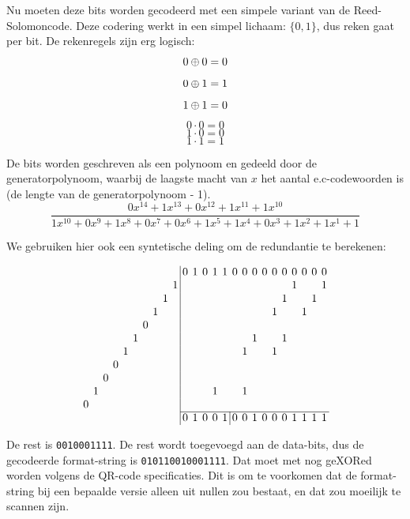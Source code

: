 \documentclass[a4paper]{article}
\begin{document}
Nu moeten deze bits worden gecodeerd met een simpele variant van de Reed-Solomoncode. Deze codering werkt in een simpel lichaam: $\{0,1\}$, dus reken gaat per bit. De rekenregels zijn erg logisch:
$$0 \mathbin{\oplus} 0=0$$
$$0 \mathbin{\oplus} 1=1$$
$$1 \mathbin{\oplus} 1=0$$
$$0\cdot0=0$$
$$1\cdot0=0$$
$$1\cdot1=1$$

De bits worden geschreven als een polynoom en gedeeld door de generatorpolynoom, waarbij de laagste macht van $x$ het aantal e.c-codewoorden is (de lengte van de generatorpolynoom - 1).
$$\frac{0x^{14}+1x^{13}+0x^{12}+1x^{11}+1x^{10}}
{1x^{10}+0x^9+1x^8+0x^7+0x^6+1x^5+1x^4+0x^3+1x^2+1x^1+1}
$$

We gebruiken hier ook een syntetische deling om de redundantie te berekenen:

\[
\setlength{\tabcolsep}{2pt}
\begin{tabular}{rrrrrrrrrr|rrrrrrrrrrrrrrr}
&&&&&&&&&&0&1&0&1&1&0&0&0&0&0&0&0&0&0&0\\
&&&&&&&&&1&&&&&&&&&&&&1&&&1\\
&&&&&&&&1&&&&&&&&&&&&1&&&1&\\
&&&&&&&1&&&&&&&&&&&&1&&&1&&\\
&&&&&&0&&&&&&&&&&&&&&&&&&\\
&&&&&1&&&&&&&&&&&&1&&&1&&&&\\
&&&&1&&&&&&&&&&&&1&&&1&&&&&\\
&&&0&&&&&&&&&&&&&&&&&&&&&\\
&&0&&&&&&&&&&&&&&&&&&&&&&\\
&1&&&&&&&&&&&&1&&&1&&&&&&&&\\
0&&&&&&&&&&&&&&&&&&&&&&&&\\\cline{11-25}
&&&&&&&&&&0&1&0&0&\multicolumn{1}{r|}{1}&0&0&1&0&0&0&1&1&1&1
\end{tabular}
\]

De rest is \texttt{0010001111}. De rest wordt toegevoegd aan de data-bits, dus de gecodeerde format-string is \texttt{010110010001111}. Dat moet met nog geXORed worden volgens de QR-code specificaties. Dit is om te voorkomen dat de format-string bij een bepaalde versie alleen uit nullen zou bestaat, en dat zou moeilijk te scannen zijn.

\end{document}
